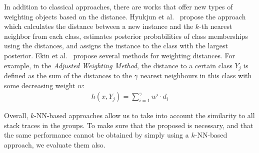 In addition to classical approaches, there are works that offer new types of weighting objects based on the distance.
Hyukjun et al.~\cite{k_conditional} propose the approach which calculates the distance between a new instance and the $k$-th nearest neighbor from each class, estimates posterior probabilities of class memberships using the distances, and assigns the instance to the class with the largest posterior. 
Ekin et al.~\cite{distance_based} propose several methods for weighting distances.
For example, in the \textit{Adjusted Weighting Method}, the distance to a certain class $Y_j$ is defined as the sum of the distances to the $\gamma$ nearest neighbours in this class with some decreasing weight $w$:
\begin{gather*}
    h(x, Y_j) = \sum_{i=1}^{\gamma}w^i \cdot d_i
\end{gather*}

Overall, $k$-NN-based approaches allow us to take into account the similarity to all stack traces in the groups.
To make sure that the proposed \ag is necessary, and that the same performance cannot be obtained by simply using a $k$-NN-based approach, we evaluate them also.